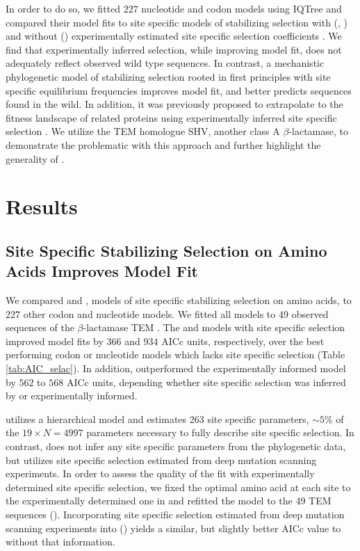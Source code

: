 In order to do so, we fitted $227$ nucleotide and codon models using IQTree and compared their model fits to site specific models of stabilizing selection with (\phydms, \selacDMS) and without (\selac) experimentally estimated site specific selection coefficients \citep{nguyen2015,hilton2017,beaulieu2018}.
We find that experimentally inferred selection, while improving model fit, does not adequately reflect observed wild type sequences.
In contrast, \selac \citep{beaulieu2018} a mechanistic phylogenetic model of stabilizing selection rooted in first principles with site specific equilibrium frequencies improves model fit, and better predicts sequences found in the wild.
In addition, it was previously proposed to extrapolate to the fitness landscape of related proteins using experimentally inferred site specific selection \citep{bloom2014, bloom2017}.
We utilize the TEM homologue SHV, another class A $\beta$-lactamase, to demonstrate the problematic with this approach and further highlight the generality of \selac.


\section{Results}

\subsection{Site Specific Stabilizing Selection on Amino Acids Improves Model Fit}
We compared \phydms \citep{hilton2017} and \selac \citep{beaulieu2018}, models of site specific stabilizing selection on amino acids, to $227$ other codon and nucleotide models.
We fitted all models to 49 observed sequences of the $\beta$-lactamase TEM \citep{bloom2014}.
The \phydms and \selac models with site specific selection improved model fits by $366$ and $934$ AICc units, respectively, over the best performing codon or nucleotide models which lacks site specific selection (Table \ref{tab:AIC_selac}).
In addition, \selac outperformed the experimentally informed model \phydms by $562$ to $568$ AICc units, depending whether site specific selection was inferred by \selac or experimentally informed.

\selac utilizes a hierarchical model and estimates 263 site specific parameters, $\sim5\%$ of the $19\times N = 4997$ parameters necessary to fully describe site specific selection.
In contrast, \phydms does not infer any site specific parameters from the phylogenetic data, but utilizes site specific selection estimated from deep mutation scanning experiments.
In order to assess the quality of the \selac fit with experimentally determined site specific selection, we fixed the optimal amino acid at each site to the experimentally determined one in \selac and refitted the model to the 49 TEM sequences (\selacDMS).
Incorporating site specific selection estimated from deep mutation scanning experiments into \selac (\selacDMS) yields a similar, but slightly better AICc value to \selac without that information.

